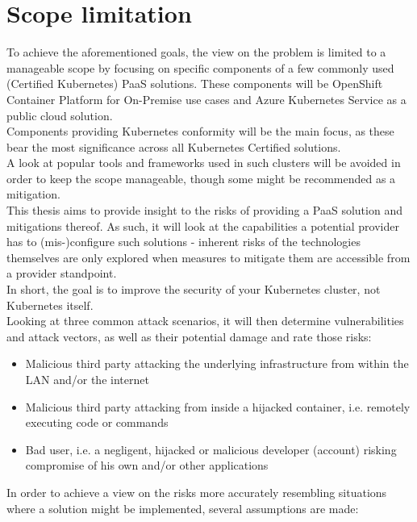 \section{Scope limitation}


To achieve the aforementioned goals, the view on the problem is limited to a manageable scope by
focusing on specific components of a few commonly used (Certified Kubernetes) PaaS solutions.
These components will be OpenShift Container Platform for On-Premise use cases and Azure Kubernetes Service as a public cloud solution. \\
Components providing Kubernetes conformity will be the main focus, as these bear the most significance across all Kubernetes Certified solutions. \\
A look at popular tools and frameworks used in such clusters will be avoided in order to keep the scope manageable, though some might be recommended as a mitigation.\\
This thesis aims to provide insight to the risks of providing a PaaS solution and mitigations thereof. 
As such, it will look at the capabilities a potential provider has to (mis-)configure such solutions - inherent risks of the technologies themselves are only explored when measures to mitigate them are accessible from a provider standpoint. \\
In short, the goal is to improve the security of your Kubernetes cluster, not Kubernetes itself.\\
Looking at three common attack scenarios, it will then determine vulnerabilities and attack vectors,
as well as their potential damage and rate those risks:

\begin{itemize}

\item Malicious third party attacking the underlying infrastructure from within the LAN and/or the internet

\item Malicious third party attacking from inside a hijacked container, i.e. remotely executing code or commands

\item Bad user, i.e. a negligent, hijacked or malicious developer (account) risking compromise of his own and/or other applications

\end{itemize}

In order to achieve a view on the risks more accurately resembling situations where a solution might be implemented, several assumptions are made:

